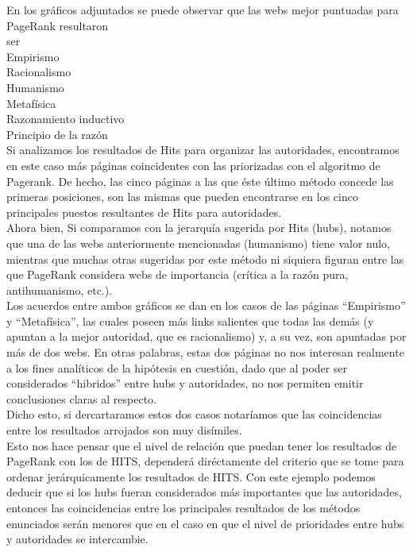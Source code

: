 \documentclass[a4paper]{article}
\begin{document}
En los gráficos adjuntados se puede observar que las webs mejor puntuadas para PageRank resultaron\\ ser \\
Empirismo \\
Racionalismo \\
Humanismo \\
Metafísica \\
Razonamiento inductivo \\
Principio de la razón \\
\indent Si analizamos los resultados de Hits para organizar las autoridades, encontramos en este caso más páginas coincidentes con las priorizadas con el algoritmo de Pagerank. De hecho, las cinco páginas a las que éste último método concede las primeras posiciones, son las mismas que pueden encontrarse en los cinco principales puestos resultantes de Hits para autoridades.  \\
\indent Ahora bien, Si comparamos con la jerarquía sugerida por Hits (hubs), notamos que una de las webs anteriormente mencionadas (humanismo) tiene valor nulo, mientras que muchas otras sugeridas por este método ni siquiera figuran entre las que PageRank considera webs de importancia (crítica a la razón pura, antihumanismo, etc.). \\
\indent Los acuerdos entre ambos gráficos se dan en los casos de las páginas ``Empirismo'' y ``Metafísica'', las cuales poseen más links salientes que todas las demás (y apuntan a la mejor autoridad, que es racionalismo) y, a su vez, son apuntadas por más de dos webs. En otras palabras, estas dos páginas no nos interesan realmente a los fines analíticos de la hipótesis en cuestión, dado que al poder ser considerados ``hibridos'' entre hubs y autoridades, no nos permiten emitir conclusiones claras al respecto.\\
\indent Dicho esto, si dercartaramos estos dos casos notaríamos que las coincidencias entre los resultados arrojados son muy disímiles.\\
\indent Esto nos hace pensar que el nivel de relación que puedan tener los resultados de PageRank con los de HITS, dependerá diréctamente del criterio que se tome para ordenar jerárquicamente los resultados de HITS. Con este ejemplo podemos deducir que si los hubs fueran considerados más importantes que las autoridades, entonces las coincidencias entre los principales resultados de los métodos enunciados serán menores que en el caso en que el nivel de prioridades entre hubs y autoridades se intercambie.
\end{document}
